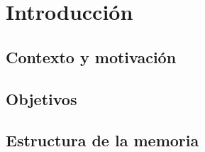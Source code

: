 \chapter{Introducción}
\section{Contexto y motivación}
\section{Objetivos}
\section{Estructura de la memoria}
